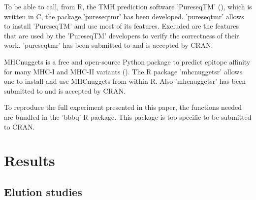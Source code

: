 
To be able to call, from R, the TMH prediction 
software 'PureseqTM' (\cite{wang2019efficient}),
which is written in C, the package 'pureseqtmr' has been developed. 
'pureseqtmr' allows to install 'PureseqTM' and use most of its features.
Excluded are the features that are used by the 'PureseqTM' 
developers to verify the correctness of their work.
'pureseqtmr' has been submitted to and is accepted by CRAN.


MHCnuggets is a free and open-source Python package to predict 
epitope affinity for many MHC-I and MHC-II variants (\cite{shao2020high}).
The R package 'mhcnuggetsr' allows one to install and use MHCnuggets
from within R.
Also 'mhcnuggetsr' has been submitted to and is accepted by CRAN.


To reproduce the full experiment presented in this paper,
the functions needed are bundled in the 'bbbq' R package.
This package is too specific to be submitted to CRAN.

\section{Results}

\subsection{Elution studies}



